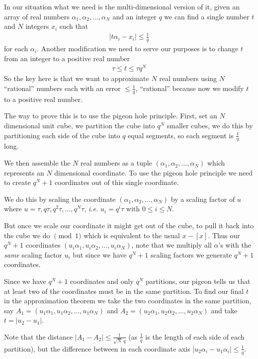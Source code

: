 \documentclass[aps,preprint,preprintnumbers,nofootinbib,showpacs,prd]{revtex4-1}
\newcommand{\ie}{{\it i.e.} }
\newcommand{\nbea}{\begin{eqnarray*}}
\newcommand{\neea}{\end{eqnarray*}}
\begin{document}
In our situation what we need is the multi-dimensional version of it, given an array of real numbers $\alpha_1, \alpha_2, \dots, \alpha_N$ and an integer $q$ we can find a single number $t$ and $N$ integers $x_i$ such that
%
\nbea
\left | t\alpha_i - x_i \right | \le \frac{1}{q}
\neea
%
for each $\alpha_i$. Another modification we need to serve our purposes is to change $t$ from an integer to a positive real number 
%
\nbea
\tau \le t \le \tau q^{N}
\neea
%
So the key here is that we want to approximate $N$ real numbers using $N$ ``rational'' numbers each with an error $\le \frac{1}{q}$, ``rational'' because now we modify $t$ to a positive real number.

The way to prove this is to use the pigeon hole principle. First, set an $N$ dimensional unit cube, we partition the cube into $q^N$ smaller cubes, we do this by partitioning each side of the cube into $q$ equal segments, so each segment is $\tfrac{1}{q}$ long.

We then assemble the $N$ real numbers as a tuple $(\alpha_1, \alpha_2, \dots, \alpha_N)$ which represents an $N$ dimensional coordinate. To use the pigeon hole principle we need to create $q^N + 1$ coordinates out of this single coordinate.

We do this by scaling the coordinate $(\alpha_1, \alpha_2, \dots, \alpha_N)$ by a scaling factor of $u$ where $u = \tau, q\tau, q^2\tau, \dots, q^N \tau$, \ie $u_i = q^i \tau$ with $0 \le i \le N$.

But once we scale our coordinate it might get out of the cube, to pull it back into the cube we do $\pmod{1}$ which is equivalent to the usual $x - [x]$. Thus our $q^N + 1$ coordinates $(u_i\alpha_1, u_i\alpha_2, \dots, u_i\alpha_N)$, note that we multiply all $\alpha$'s with the {\it same} scaling factor $u_i$ but since we have $q^N + 1$ scaling factors we generate $q^N + 1$ coordinates.

Since we have $q^N + 1$ coordinates and only $q^N$ partitions, our pigeon tells us that at least two of the coordinates must be in the same partition. To find our final $t$ in the approximation theorem we take the two coordinates in the same partition, say $A_1 = (u_1\alpha_1, u_1\alpha_2, \dots, u_1\alpha_N)$ and $A_2 = (u_2\alpha_1, u_2\alpha_2, \dots, u_2\alpha_N)$ and take $t = |u_2 - u_1|$.

Note that the distance $|A_1 - A_2| \le \frac{1}{\sqrt{N}~q}$ (as $\frac{1}{q}$ is the length of each side of each partition), but the difference between in each coordinate axis $|u_2\alpha_i - u_1\alpha_i| \le \frac{1}{q}$.
\end{document}
